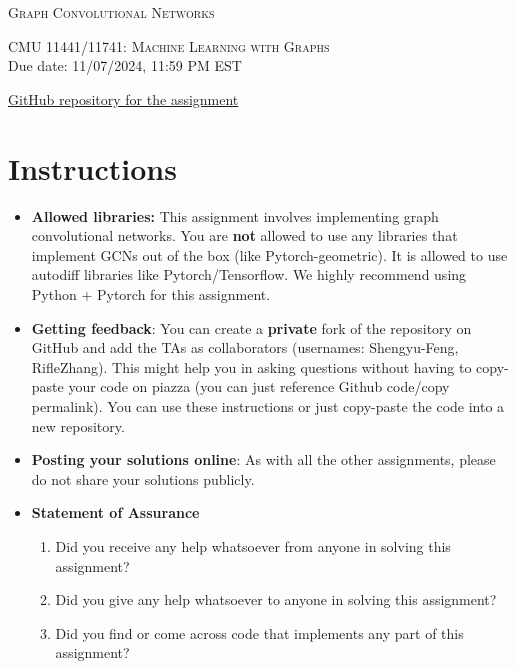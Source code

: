 \section*{}
\begin{center}
  \centerline{\textsc{\LARGE  Graph Convolutional Networks}}
  \vspace{0.5em}
  \vspace{1em}
  \textsc{\large CMU 11441/11741: Machine Learning with Graphs} \\
  Due date: 11/07/2024, 11:59 PM EST
  
  \href{https://github.com/Shengyu-Feng/mlwg_f24_hw4}{GitHub repository for the assignment}
  \vspace{0.5em}

\end{center}

\section*{Instructions}
\begin{itemize}
\item \textbf{Allowed libraries:} This assignment involves implementing graph convolutional networks. You are \textbf{not} allowed to use any libraries that implement GCNs out of the box (like Pytorch-geometric).
It is allowed to use autodiff libraries like Pytorch/Tensorflow. We highly recommend using Python + Pytorch for this assignment.

\item \textbf{Getting feedback}:
You can create a \textbf{private} fork of the repository on GitHub and add the TAs as collaborators (usernames: Shengyu-Feng, RifleZhang). This might help you in asking questions without having to copy-paste your code on piazza (you can just reference Github code/copy permalink). You can use these instructions or just copy-paste the code into a new repository.

\item \textbf{Posting your solutions online}:
As with all the other assignments, please do not share your solutions publicly.

\item \textbf{Statement of Assurance}

\begin{enumerate}
    \item Did you receive any help whatsoever from anyone in solving this assignment?
    \item Did you give any help whatsoever to anyone in solving this assignment? 
    \item Did you find or come across code that implements any part of this assignment?
\end{enumerate}
\end{itemize}
